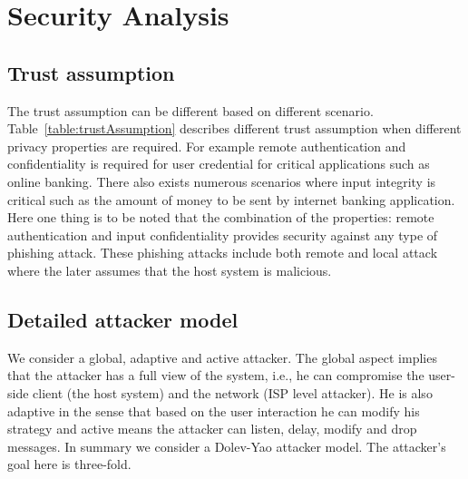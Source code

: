 \section{Security Analysis}
\label{sec:securityAnalysis}

\subsection{Trust assumption}
\label{sec:securityAnalysis:trustAssumption}

The trust assumption can be different based on different scenario.
Table~\ref{table:trustAssumption} describes different trust assumption when
different privacy properties are required. For example remote authentication
and confidentiality is required for user credential for critical applications
such as online banking. There also exists numerous scenarios where input
integrity is critical such as the amount of money to be sent by internet banking
application. Here one thing is to be noted that the combination of the
properties: remote authentication and input confidentiality provides security
against any type of phishing attack. These phishing attacks include both remote
and local attack where the later assumes that the host system is malicious.


\subsection{Detailed attacker model}
\label{sec:securityAnalysis:attackerModel}

We consider a global, adaptive and active attacker. The global aspect implies
that the attacker has a full view of the system, i.e., he can compromise the
user-side client (the host system) and the network (ISP level attacker). He is
also adaptive in the sense that based on the user interaction he can modify his
strategy and active means the attacker can listen, delay, modify and drop
messages. In summary we consider a Dolev-Yao attacker model. The attacker's goal
here is three-fold.

